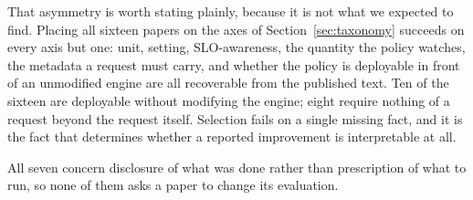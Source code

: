 That asymmetry is worth stating plainly, because it is not what we
expected to find. Placing all sixteen papers on the axes of
Section~\ref{sec:taxonomy} succeeds on every axis but one: unit,
setting, SLO-awareness, the quantity the policy watches, the metadata a
request must carry, and whether the policy is deployable in front of an
unmodified engine are all recoverable from the published text. Ten of
the sixteen are deployable without modifying the engine; eight require
nothing of a request beyond the request itself. Selection fails on a
single missing fact, and it is the fact that determines whether a
reported improvement is interpretable at all.

All seven concern disclosure of what was done rather than prescription
of what to run, so none of them asks a paper to change its evaluation.

